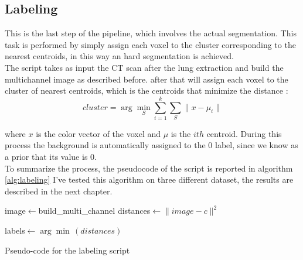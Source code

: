 
	
	\subsection{Labeling}
	
	This is the last step of the pipeline, which involves the actual segmentation. This task is performed by simply assign each voxel to the cluster corresponding to the nearest centroids, in this way an hard segmentation is achieved.\\
	
	The script takes as input the CT scan after the lung extraction and build the multichannel image as described before. after that will assign each voxel to the cluster of nearest centroids, which is the centroids that minimize the distance : 
	\begin{equation}
		cluster = \arg\min_{S}  \sum_{i=1}^k \sum_{S} \| x - \mu_i\|
	\end{equation}

	where $x$ is the color vector of the voxel and $\mu$ is the $ith$ centroid. During this process the background is automatically assigned to the 0 label, since we know as a prior that its value is $0$.\\
	To summarize the process, the pseudocode of the script is reported in algorithm\,\ref{alg:labeling}
	 I've tested this algorithm on three different dataset, the results are described in the next chapter.
	 
	 	\begin{algorithm}
	 	
	 	\SetAlgoLined
	 	\DontPrintSemicolon
	 	
	
 		
 		image$\leftarrow$build\_multi\_channel\;
 		{
 			distances$\leftarrow\| image - c\|^2$\;
 		}
 		
 		labels$\leftarrow\arg\min\,(distances)$\;
	 
	 	\caption{Pseudo-code for the labeling script}\label{alg:labeling}
	 
	 \end{algorithm}
	 
	
	
